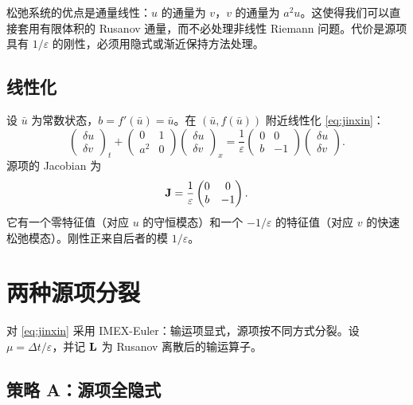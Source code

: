 松弛系统的优点是通量线性：$u$ 的通量为 $v$，$v$ 的通量为 $a^2u$。这使得我们可以直接套用有限体积的 Rusanov 通量，而不必处理非线性 Riemann 问题。代价是源项具有 $1/\varepsilon$ 的刚性，必须用隐式或渐近保持方法处理。

\subsection{线性化}

设 $\bar u$ 为常数状态，$b=f'(\bar u)=\bar u$。在 $(\bar u,f(\bar u))$ 附近线性化 \eqref{eq:jinxin}：
\begin{equation}
  \begin{pmatrix}\delta u\\ \delta v\end{pmatrix}_t
  +\begin{pmatrix}0&1\\ a^2&0\end{pmatrix}
  \begin{pmatrix}\delta u\\ \delta v\end{pmatrix}_x
  =\frac{1}{\varepsilon}
  \begin{pmatrix}0&0\\ b&-1\end{pmatrix}
  \begin{pmatrix}\delta u\\ \delta v\end{pmatrix}.
  \label{eq:jinxin-linear}
\end{equation}
源项的 Jacobian 为
\begin{equation}
  {\mathbf{J}}=\frac{1}{\varepsilon}
  \begin{pmatrix}0&0\\ b&-1\end{pmatrix}.
  \label{eq:source-jacobian}
\end{equation}
它有一个零特征值（对应 $u$ 的守恒模态）和一个 $-1/\varepsilon$ 的特征值（对应 $v$ 的快速松弛模态）。刚性正来自后者的模 $1/\varepsilon$。

\section{两种源项分裂}
\label{sec:jinxin-splitting}

对 \eqref{eq:jinxin} 采用 IMEX-Euler：输运项显式，源项按不同方式分裂。设 $\mu=\Delta t/\varepsilon$，并记 ${\mathbf{L}}$ 为 Rusanov 离散后的输运算子。

\subsection{策略 A：源项全隐式}

